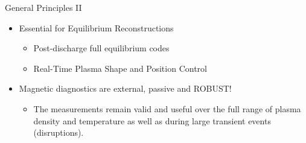 \documentclass{beamer}
\begin{document}
\begin{frame}{General Principles II}%
  \begin{itemize}
  \item Essential for \alert{Equilibrium}  Reconstructions
   \begin{itemize}
		\item Post-discharge full equilibrium codes
		\item Real-Time Plasma Shape and Position Control
  \end{itemize}
  \item<2-> Magnetic diagnostics are external, passive and \alert{ ROBUST}!
   \begin{itemize}
		\item The measurements remain valid and useful over the full range of 
		plasma density and temperature as well as during large transient events (disruptions).
  \end{itemize}
  \end{itemize}
\end{frame}	
\end{document}
